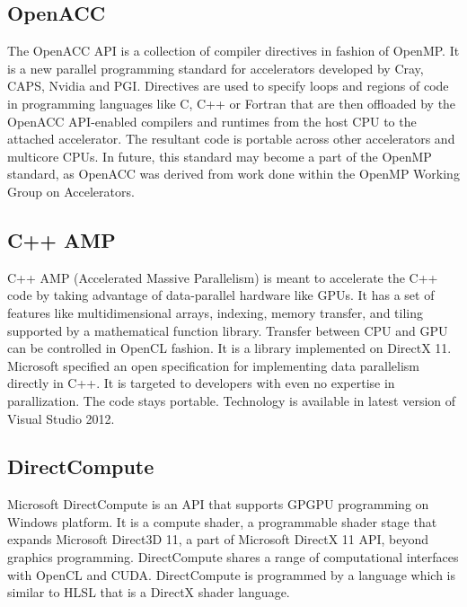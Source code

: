 
\subsection{OpenACC}
The OpenACC API is a collection of compiler directives in fashion of OpenMP. It is a new parallel programming standard for accelerators developed by Cray, CAPS, Nvidia and PGI.  Directives are used to specify loops and regions of code in programming languages like C, C++ or Fortran that are then offloaded by the OpenACC API-enabled compilers and runtimes from the host CPU to the attached accelerator. The resultant code is portable across other accelerators and multicore CPUs. In future, this standard may become a part of the OpenMP standard, as OpenACC was derived from work done within the OpenMP Working Group on Accelerators.


\subsection{C++ AMP}
C++ AMP (Accelerated Massive Parallelism) is meant to accelerate the C++ code by taking advantage of data-parallel hardware like GPUs. It has a set of features like multidimensional arrays, indexing, memory transfer, and tiling supported by a mathematical function library. Transfer between CPU and GPU can be controlled in OpenCL fashion. It is a library implemented on DirectX 11. Microsoft specified an open specification for implementing data parallelism directly in C++. It is targeted to developers with even no expertise in parallization. The code stays portable. Technology is available in latest version of Visual Studio 2012.


\subsection{DirectCompute}
Microsoft DirectCompute is an API that supports GPGPU programming on Windows platform. It is a compute shader, a programmable shader stage that expands Microsoft Direct3D 11, a part of Microsoft DirectX 11 API, beyond graphics programming. DirectCompute shares a range of computational interfaces  with OpenCL and CUDA. DirectCompute is programmed by a language which is similar to HLSL that is a DirectX shader language.

